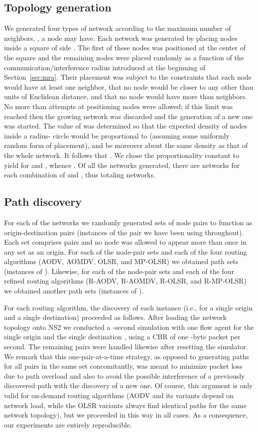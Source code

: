 \documentclass{article}
\begin{document}
\subsection{Topology generation}

We generated four types of network according to the maximum number of neighbors,
, a node may have.  Each network was generated by placing  nodes
inside a square of side . The first of these nodes was positioned at the
center of the square and the remaining nodes were placed randomly as a function
of the communication/interference radius  introduced at the beginning of
Section~\ref{sec:mra}. Their placement was subject to the constraints that each
node would have at least one neighbor, that no node would be closer to any other
than  units of Euclidean distance, and that no node would have more than
 neighbors. No more than  attempts at positioning nodes were
allowed; if this limit was reached then the growing network was discarded and
the generation of a new one was started. The value of  was determined so
that the expected density of nodes inside a radius- circle would be
proportional to  (assuming some uniformly random form of placement),
and be moreover about the same density as that of the whole network. It follows
that . We chose the proportionality constant to yield
 for  and , whence . Of all the
networks generated, there are  networks for each combination of
 and , thus totaling 
networks.

\subsection{Path discovery}

For each of the  networks we randomly generated  sets of node pairs
to function as origin-destination pairs (instances of the  pair we have
been using throughout). Each set comprises  pairs and no node was allowed to
appear more than once in any set as an origin. For each of the node-pair sets
and each of the four routing algorithms (AODV, AOMDV, OLSR, and MP-OLSR) we
obtained  path sets (instances of ). Likewise, for each of
the node-pair sets and each of the four refined routing algorithms (R-AODV,
R-AOMDV, R-OLSR, and R-MP-OLSR) we obtained another  path sets (instances of
).

For each routing algorithm, the discovery of each  instance
(i.e., for a single origin and a single destination) proceeded as follows. After
loading the network topology onto NS2 we conducted a -second simulation with
one flow agent for the single origin  and the single destination , using a
CBR of one -byte packet per second. The remaining pairs were handled
likewise after resetting the simulator. We remark that this one-pair-at-a-time
strategy, as opposed to generating paths for all  pairs in the same set
concomitantly, was meant to minimize packet loss due to path overload and also
to avoid the possible interference of a previously discovered path with the
discovery of a new one. Of course, this argument is only valid for on-demand
routing algorithms (AODV and its variants depend on network load, while the OLSR
variants always find identical paths for the same network topology), but we
proceeded in this way in all cases. As a consequence, our experiments are
entirely reproducible.
\end{document}
